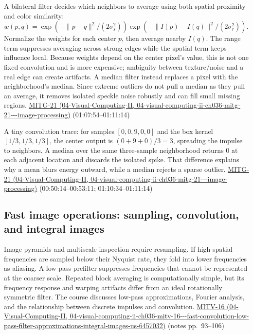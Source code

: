 A bilateral filter decides which neighbors to average using both spatial proximity and color similarity: \(w(p,q)=\exp(-\|p-q\|^2/(2\sigma_s^2))\exp(-\|I(p)-I(q)\|^2/(2\sigma_r^2))\). Normalize the weights for each center \(p\), then average nearby \(I(q)\). The range term suppresses averaging across strong edges while the spatial term keeps influence local. Because weights depend on the center pixel's value, this is not one fixed convolution and is more expensive; ambiguity between texture/noise and a real edge can create artifacts. A median filter instead replaces a pixel with the neighborhood's median. Since extreme outliers do not pull a median as they pull an average, it removes isolated speckle noise robustly and can fill small missing regions. \href{../04-Visual-Computing-II/main.pdf\#nameddest=04-visual-computing-ii-ch036-mitg-21---image-processing}{MITG-21 (04-Visual-Computing-II, 04-visual-computing-ii-ch036-mitg-21-\/-\/-image-processing)} (01:07:54--01:11:14)

A tiny convolution trace: for samples \([0,0,9,0,0]\) and the box kernel \([1/3,1/3,1/3]\), the center output is \((0+9+0)/3=3\), spreading the impulse to neighbors. A median over the same three-sample neighborhood returns \(0\) at each adjacent location and discards the isolated spike. That difference explains why a mean blurs energy outward, while a median rejects a sparse outlier. \href{../04-Visual-Computing-II/main.pdf\#nameddest=04-visual-computing-ii-ch036-mitg-21---image-processing}{MITG-21 (04-Visual-Computing-II, 04-visual-computing-ii-ch036-mitg-21-\/-\/-image-processing)} (00:50:14--00:53:11; 01:10:34--01:11:14)

\subsection{Fast image operations: sampling, convolution, and integral images}\label{03-visual-computing-i-ch004-fast-image-operations-sampling-convolution-and-integral-images}

Image pyramids and multiscale inspection require resampling. If high spatial frequencies are sampled below their Nyquist rate, they fold into lower frequencies as aliasing. A low-pass prefilter suppresses frequencies that cannot be represented at the coarser scale. Repeated block averaging is computationally simple, but its frequency response and warping artifacts differ from an ideal rotationally symmetric filter. The course discusses low-pass approximations, Fourier analysis, and the relationship between discrete impulses and convolution. \href{../04-Visual-Computing-II/main.pdf\#nameddest=04-visual-computing-ii-ch036-mitv-16---fast-convolution-low-pass-filter-approximations-integral-images-us-6457032}{MITV-16 (04-Visual-Computing-II, 04-visual-computing-ii-ch036-mitv-16-\/-\/-fast-convolution-low-pass-filter-approximations-integral-images-us-6457032)} (notes pp.~93--106)

